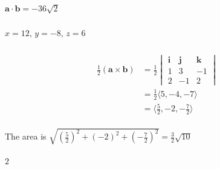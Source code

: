 \documentclass{article}
\begin{document}
\setcounter{subsubsection}{22}
\subsubsection{}

$\mathbf{a} \cdot \mathbf{b} = -36 \sqrt{2}$

\setcounter{subsubsection}{24}
\subsubsection{}

$x = 12$, $y = -8$, $z = 6$

\setcounter{subsubsection}{26}
\subsubsection{}

\begin{align*}
  \frac{1}{2} (\mathbf{a} \times \mathbf{b}) & = \frac{1}{2} \begin{vmatrix}
                                                               \mathbf{i} & \mathbf{j} & \mathbf{k} \\
                                                               1          & 3          & -1         \\
                                                               2          & -1         & 2
                                                             \end{vmatrix} \\
                                             & = \frac{1}{2} \langle 5, -4, -7 \rangle            \\
                                             & = \langle \frac{5}{2}, -2, -\frac{7}{2} \rangle    \\
\end{align*}

The area is $\sqrt{\left( \frac{5}{2} \right)^2 + (-2)^2 + \left( -\frac{7}{2} \right)^2} = \frac{3}{2} \sqrt{10}$

\setcounter{subsubsection}{28}
\subsubsection{}

$2$

\setcounter{subsubsection}{30}
\subsubsection{}
\end{document}
